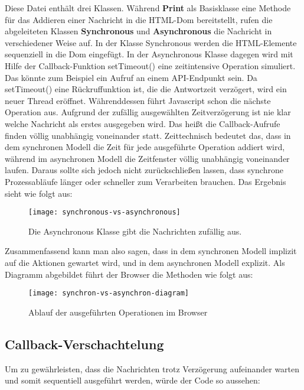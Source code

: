 \noindent
Diese Datei enthält drei Klassen. Während \textbf{Print} als Basisklasse eine Methode für das Addieren einer Nachricht in die HTML-Dom bereitstellt, rufen die abgeleiteten Klassen \textbf{Synchronous} und \textbf{Asynchronous} die Nachricht in verschiedener Weise auf. In der Klasse Synchronous werden die HTML-Elemente sequenziell in die Dom eingefügt. In der Asynchronous Klasse dagegen wird mit Hilfe der Callback-Funktion setTimeout() eine zeitintensive Operation simuliert. Das könnte zum Beispiel ein Aufruf an einem API-Endpunkt sein. Da setTimeout() eine Rückruffunktion ist, die die Antwortzeit verzögert, wird ein neuer Thread eröffnet. Währenddessen führt Javascript schon die nächste Operation aus. Aufgrund der zufällig ausgewählten Zeitverzögerung ist nie klar welche Nachricht als erstes ausgegeben wird. Das heißt die Callback-Aufrufe finden völlig unabhängig voneinander statt. Zeittechnisch bedeutet das, dass in dem synchronen Modell die Zeit für jede ausgeführte Operation addiert wird, während im asynchronen Modell die Zeitfenster völlig unabhängig voneinander laufen. Daraus sollte sich jedoch nicht zurückschließen lassen, dass synchrone Prozessabläufe länger oder schneller zum Verarbeiten brauchen.
Das Ergebnis sieht wie folgt aus:

\begin{figure}[H]
\centering
\texttt{[image: synchronous-vs-asynchronous]}
\caption{Die Asynchronous Klasse gibt die Nachrichten zufällig aus.}
\end{figure}

\noindent
Zusammenfassend kann man also sagen, dass in dem synchronen Modell implizit auf die Aktionen gewartet wird, und in dem asynchronen Modell explizit. Als Diagramm abgebildet führt der Browser die Methoden wie folgt aus:

\begin{center}
\begin{figure}[H]
\texttt{[image: synchron-vs-asynchron-diagram]}
\caption{Ablauf der ausgeführten Operationen im Browser}
\end{figure}
\end{center}

\subsection{Callback-Verschachtelung}

Um zu gewährleisten, dass die Nachrichten trotz Verzögerung aufeinander warten und somit sequentiell ausgeführt werden, würde der Code so aussehen:

